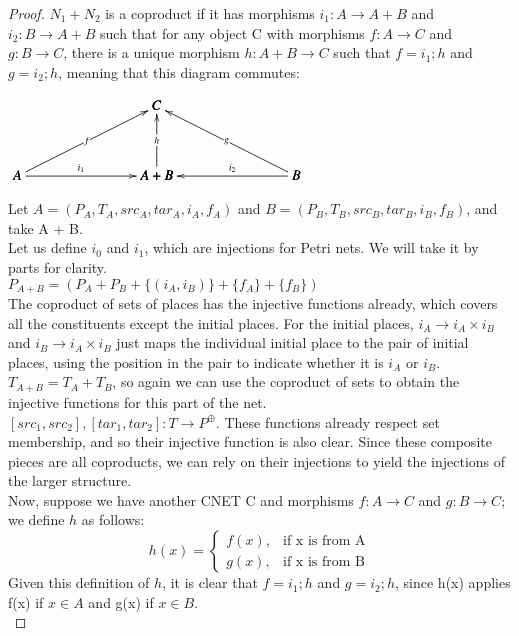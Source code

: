\begin {proof}
$N_1 + N_2$ is a coproduct if it has morphisms $i_1: A \to A + B$ and $i_2: B \to A + B$ such that for any object C with morphisms $f: A\to C$ and $g: B\to C$, there is a unique morphism $h: A + B \to C$ such that $f = i_1;h$ and $g = i_2; h$, meaning that this diagram commutes:\\
\begin{center}
  \begin{math}
    \bfig
    \Atrianglepair|mmmaa|/<-`<-`<-`->`<-/<1000,500>[
      C`
      A`
      A+B`
      B;
      f`
      h`
      g`
      i_1`
      i_2]
    \efig
  \end{math}
\end{center}
Let $A = (P_A, T_A, src_A, tar_A, i_A, f_A)$ and $B = (P_B, T_B, src_B, tar_B, i_B, f_B)$, and take A + B.\\
Let us define $i_0$ and $i_1$, which are injections for Petri nets. We will take it by parts for clarity.\\
$P_{A+B} = (P_A +P_B+\{(i_A, i_B)\} +\{f_A\} + \{f_B\})$\\
The coproduct of sets of places has the injective functions already, which covers all the constituents except the initial places. For the initial places, $i_A \to i_A \times i_B$ and $i_B \to i_A \times i_B$ just maps the individual initial place to the pair of initial places, using the position in the pair to indicate whether it is $i_A$ or $i_B$.\\
$T_{A+B} = T_A + T_B$, so again we can use the coproduct of sets to obtain the injective functions for this part of the net.\\
 $[src_1, src_2], [tar_1, tar_2]: T\to P^\oplus$. These functions already respect set membership, and so their injective function is also clear. Since these composite pieces are all coproducts, we can rely on their injections to yield the injections of the larger structure.\smallskip\\ 
Now, suppose we have another CNET C and morphisms $f: A\to C$ and $g: B\to C$; we define $h$ as follows:\\
  \begin{equation}
    h(x)=
    \begin{cases}
      f(x), & \text{if x is from A}\\
      g(x), & \text{if x is from B}
    \end{cases}
  \end{equation}
Given this definition of $h$, it is clear that $f = i_1;h$ and $g = i_2;h$, since h(x) applies f(x) if $x \in A$ and g(x) if $x \in B$.\\

\end{proof}
